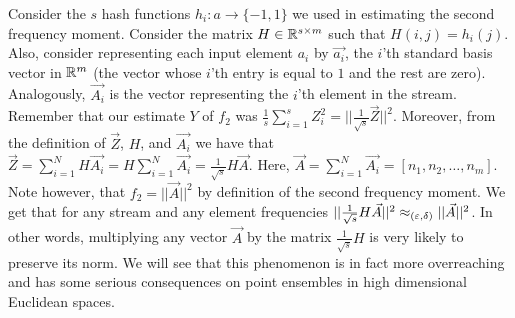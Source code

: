 \documentclass{article}
\begin{document}
Consider the $s$ hash functions $h_i:a\rightarrow \{-1,1\}$ we used in estimating the second frequency moment.  
Consider the matrix $H \in {\mathbb{R}}^{s \times m}$ such that $H(i,j) = h_{i}(j)$.
Also, consider representing each input element $a_i$ by $\vec{a_i}$, the $i$'th standard basis vector in ${\mathbb{R}}^m$ (the vector whose $i$'th entry is equal to $1$ and the rest are zero). Analogously, $\vec{A_i}$ is the vector representing the $i$'th element in the stream. Remember that our estimate $Y$ of $f_2$ was $\frac{1}{s}\sum_{i=1}^{s}Z_{i}^2= ||\frac{1}{\sqrt{s}}\vec{Z}||^2$. Moreover, from the definition of $\vec{Z}$, $H$, and $\vec{A_i}$ we have that $\vec{Z} = \sum_{i=1}^{N}H\vec{A_i} = H\sum_{i=1}^{N}\vec{A_i} = \frac{1}{\sqrt{s}}H\vec{A}$. Here, $\vec{A} = \sum_{i=1}^{N}\vec{A_i} = [n_1,n_2,\ldots,n_m]$. Note however, that $f_2 = ||\vec{A}||^2$ by definition of the second frequency moment.
We get that for any stream and any element frequencies $ ||\frac{1}{\sqrt{s}}H\vec{A}||^2 \approx_{(\varepsilon,\delta)} ||\vec{A}||^2$.
In other words,  multiplying any vector $\vec{A}$ by the matrix $\frac{1}{\sqrt{s}}H$ is very likely to preserve its norm.
We will see that this phenomenon is in fact more overreaching and has some serious consequences on point ensembles in high dimensional Euclidean spaces. 
\end{document}
